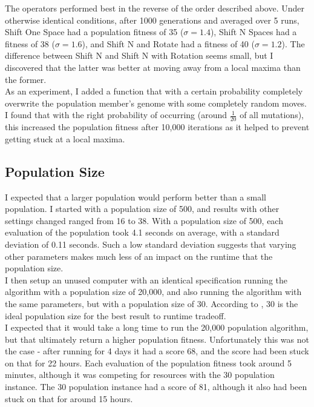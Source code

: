 \documentclass[]{report}
\begin{document}
The operators performed best in the reverse of the order described above. Under otherwise identical conditions, after 1000 generations and averaged over 5 runs, Shift One Space had a population fitness of 35 ($\sigma=1.4$), Shift N Spaces had a fitness of 38 ($\sigma=1.6$), and Shift N and Rotate had a fitness of 40 ($\sigma=1.2$). The difference between Shift N and Shift N with Rotation seems small, but I discovered that the latter was better at moving away from a local maxima than the former.\\

As an experiment, I added a function that with a certain probability completely overwrite the population member's genome with some completely random moves. I found that with the right probability of occurring (around $\frac{1}{20}$ of all mutations), this increased the population fitness after 10,000 iterations as it helped to prevent getting stuck at a local maxima.

\subsection{Population Size}
I expected that a larger population would perform better than a small population. I started with a population size of 500, and results with other settings changed ranged from 16 to 38. With a population size of 500, each evaluation of the population took 4.1 seconds on average, with a standard deviation of 0.11 seconds. Such a low standard deviation suggests that varying other parameters makes much less of an impact on the runtime that the population size.\\

I then setup an unused computer with an identical specification running the algorithm with a population size of 20,000, and also running the algorithm with the same parameters, but with a population size of 30. According to \cite{somePaper}, 30 is the ideal population size for the best result to runtime tradeoff. \\

I expected that it would take a long time to run the 20,000 population algorithm, but that ultimately return a higher population fitness. Unfortunately this was not the case - after running for 4 days it had a score 68, and the score had been stuck on that for 22 hours. Each evaluation of the population fitness took around 5 minutes, although it was competing for resources with the 30 population instance. The 30 population instance had a score of 81, although it also had been stuck on that for around 15 hours.
\end{document}
